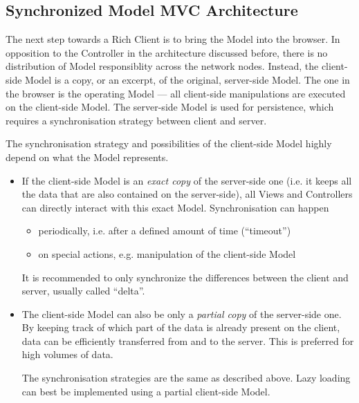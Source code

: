 
\subsection{Synchronized Model MVC Architecture}
The next step towards a Rich Client is to bring the Model into the browser. In opposition to the Controller in the architecture discussed before, there is no distribution of Model responsiblity across the network nodes. Instead, the client-side Model is a copy, or an excerpt, of the original, server-side Model. The one in the browser is the operating Model --- all client-side manipulations are executed on the client-side Model. The server-side Model is used for persistence, which requires a synchronisation strategy between client and server.

The synchronisation strategy and possibilities of the client-side Model highly depend on what the Model represents.
\begin{itemize}
	\item If the client-side Model is an \emph{exact copy} of the server-side one (i.e. it keeps all the data that are also contained on the server-side), all Views and Controllers can directly interact with this exact Model. Synchronisation can happen
	\begin{itemize}
		\item periodically, i.e. after a defined amount of time (``timeout'')
		\item on special actions, e.g. manipulation of the client-side Model
	\end{itemize}
	It is recommended to only synchronize the differences between the client and server, usually called ``delta''.

	\item The client-side Model can also be only a \emph{partial copy} of the server-side one. By keeping track of which part of the data is already present on the client, data can be efficiently transferred from and to the server. This is preferred for high volumes of data. 

	The synchronisation strategies are the same as described above. Lazy loading can best be implemented using a partial client-side Model.
\end{itemize}

